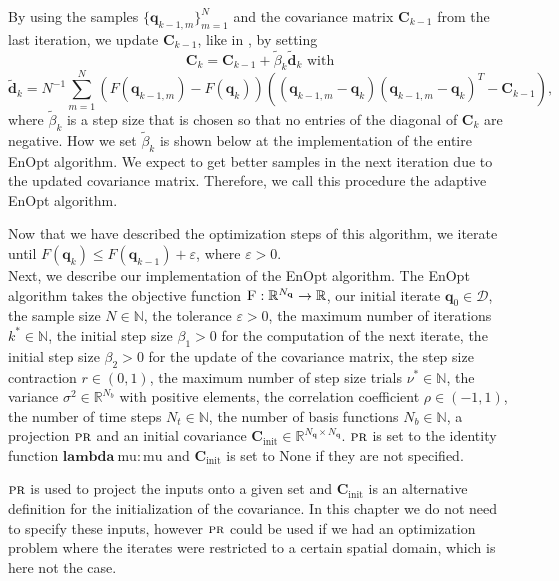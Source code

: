 By using the samples $\{\mathbf{q}_{k-1,m}\}_{m=1}^N$ and the covariance matrix $\mathbf{C}_{k-1}$ from the last iteration, we update $\mathbf{C}_{k-1}$, like in \cite{Stordal2016-cj}, by setting
\begin{equation}
\label{updateCov}
\mathbf{C}_k=\mathbf{C}_{k-1}+\tilde{\beta}_k\tilde{\mathbf{d}}_k\text{ with}
\end{equation}
\begin{equation}
\label{updateCovDirection}
\tilde{\mathbf{d}}_k=N^{-1}\sum_{m=1}^N(F(\mathbf{q}_{k-1,m})-F(\mathbf{q}_k))((\mathbf{q}_{k-1,m}-\mathbf{q}_k)(\mathbf{q}_{k-1,m}-\mathbf{q}_k)^T-\mathbf{C}_{k-1}),
\end{equation}
where $\tilde{\beta}_k$ is a step size that is chosen so that no entries of the diagonal of $\mathbf{C}_k$ are negative. How we set $\tilde{\beta}_k$ is shown below at the implementation of the entire EnOpt algorithm. We expect to get better samples in the next iteration due to the updated covariance matrix. Therefore, we call this procedure the adaptive EnOpt algorithm.

Now that we have described the optimization steps of this algorithm, we iterate until $F(\mathbf{q}_k)\leq F(\mathbf{q}_{k-1})+\varepsilon$, where $\varepsilon>0$.\\

Next, we describe our implementation of the EnOpt algorithm. The EnOpt algorithm takes the objective function $\textproc{F}:\mathbb{R}^{N_\mathbf{q}}\to\mathbb{R}$, our initial iterate $\mathbf{q}_0\in\mathcal{D}$, the sample size $N\in\mathbb{N}$, the tolerance $\varepsilon>0$, the maximum number of iterations $k^*\in\mathbb{N}$, the initial step size $\beta_1>0$ for the computation of the next iterate, the initial step size $\beta_2>0$ for the update of the covariance matrix, the step size contraction $r\in(0,1)$, the maximum number of step size trials $\nu^*\in\mathbb{N}$, the variance $\sigma^2\in\mathbb{R}^{N_b}$ with positive elements, the correlation coefficient $\rho\in(-1,1)$, the number of time steps $N_t\in\mathbb{N}$, the number of basis functions $N_b\in\mathbb{N}$, a projection $\textproc{pr}$ and an initial covariance $\mathbf{C}_\mathrm{init}\in\mathbb{R}^{N_\mathbf{q}\times N_\mathbf{q}}$. $\textproc{pr}$ is set to the identity function $\mathbf{lambda}\:\mathrm{mu}: \mathrm{mu}$ and $\mathbf{C}_\mathrm{init}$ is set to $\mathrm{None}$ if they are not specified.

$\textproc{pr}$ is used to project the inputs onto a given set and $\mathbf{C}_\mathrm{init}$ is an alternative definition for the initialization of the covariance. In this chapter we do not need to specify these inputs, however $\textproc{pr}$ could be used if we had an optimization problem where the iterates were restricted to a certain spatial domain, which is here not the case.

